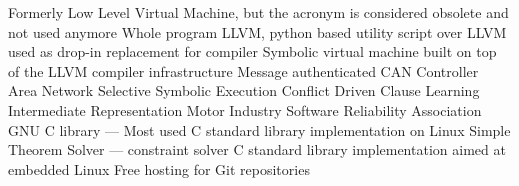   {Formerly Low Level Virtual Machine, but the acronym is
               considered obsolete and not used anymore}
 {Whole program LLVM, python based utility script over LLVM used
               as drop-in replacement for compiler}
  {Symbolic virtual machine built on top of the LLVM compiler
               infrastructure}
 {Message authenticated CAN}
 {Controller Area Network}
 {Selective Symbolic Execution}
 {Conflict Driven Clause Learning}
 {Intermediate Representation}
 {Motor Industry Software Reliability Association}
 {GNU C library --- Most used C standard library implementation on
               Linux}
 {Simple Theorem Solver --- constraint solver}
 {C standard library implementation aimed at embedded Linux}
 {Free hosting for Git repositories}

